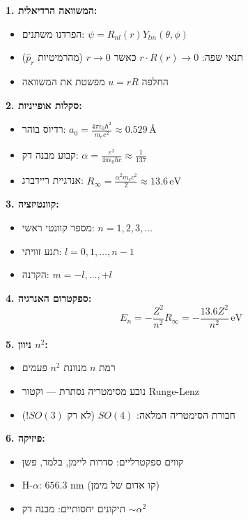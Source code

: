 \begin{summarybox}

\textbf{1. המשוואה הרדיאלית:}
\begin{itemize}
    \item הפרדנו משתנים: $\psi = R_{nl}(r) Y_{lm}(\theta,\phi)$
    \item תנאי שפה: $r \cdot R(r) \to 0$ כאשר $r \to 0$ (מהרמיטיות $\hat{p}_r$)
    \item החלפה $u = rR$ מפשטת את המשוואה
\end{itemize}

\textbf{2. סקלות אופייניות:}
\begin{itemize}
    \item רדיוס בוהר: $a_0 = \frac{4\pi\epsilon_0\hbar^2}{m_e e^2} \approx 0.529 \, \text{\AA}$
    \item קבוע מבנה דק: $\alpha = \frac{e^2}{4\pi\epsilon_0\hbar c} \approx \frac{1}{137}$
    \item אנרגיית ריידברג: $R_\infty = \frac{\alpha^2 m_e c^2}{2} \approx 13.6 \, \text{eV}$
\end{itemize}

\textbf{3. קוונטיזציה:}
\begin{itemize}
    \item מספר קוונטי ראשי: $n = 1, 2, 3, \ldots$
    \item תנע זוויתי: $l = 0, 1, \ldots, n-1$
    \item הקרנה: $m = -l, \ldots, +l$
\end{itemize}

\textbf{4. ספקטרום האנרגיה:}
\[
E_n = -\frac{Z^2}{n^2} R_\infty = -\frac{13.6 Z^2}{n^2} \, \text{eV}
\]

\textbf{5. ניוון $n^2$:}
\begin{itemize}
    \item רמת $n$ מנוונת $n^2$ פעמים
    \item נובע מסימטריה נסתרת — וקטור Runge-Lenz
    \item חבורת הסימטריה המלאה: $SO(4)$ (לא רק $SO(3)$!)
\end{itemize}

\textbf{6. פיזיקה:}
\begin{itemize}
    \item קווים ספקטרליים: סדרות ליימן, בלמר, פשן
    \item H-$\alpha$: $656.3$ nm (קו אדום של מימן)
    \item תיקונים יחסותיים: מבנה דק $\sim \alpha^2$
\end{itemize}

\end{summarybox}

